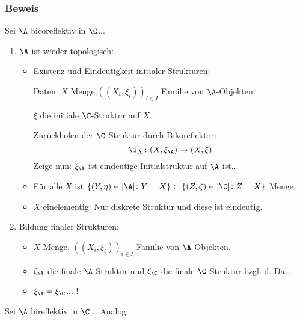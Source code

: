 \begin{frame}
\frametitle{Beweis}
Sei $\A$ bicoreflektiv in $\C$...
\pause
\begin{enumerate}[(1)]
\item<+-> $\A$ ist wieder topologisch:
\begin{itemize}
  \item<+-> Existenz und Eindeutigkeit initialer Strukturen:

  Daten: $X$ Menge,$((X_i, \xi_i))_{i \in I}$ Familie von $\A$-Objekten. 

  $\xi$ die initiale $\C$-Struktur auf $X$. 

  Zurückholen der $\C$-Struktur durch Bikoreflektor:
$$
\1_X \colon (X, \xi_\A) \to (X, \xi) 
$$
Zeige nun: $\xi_\A$ ist eindeutige Initialstruktur auf $\A$ ist...

\item<+-> Für alle $X$ ist $\{(Y, \eta) \in |\A| \colon Y = X \} \subset\{(Z, \zeta) \in |\C| \colon Z = X \}$ Menge.

\item<+-> $X$ einelementig: Nur diskrete Struktur und diese ist eindeutig.
\end{itemize}

\item<+-> Bildung finaler Strukturen:
\begin{itemize}
\item<+-> $X$ Menge, $((X_i, \xi_i))_{i \in I}$ Familie von $\A$-Objekten. 
\item<+-> $\xi_\A$ die finale $\A$-Struktur und $\xi_\C$ die finale $\C$-Struktur bzgl. d. Dat.
\item<+-> $\xi_\A = \xi_\C$... \pause !
\end{itemize}

\end{enumerate}

\pause
\vspace{2em}
Sei $\A$ bireflektiv in $\C$... Analog.

\end{frame}

